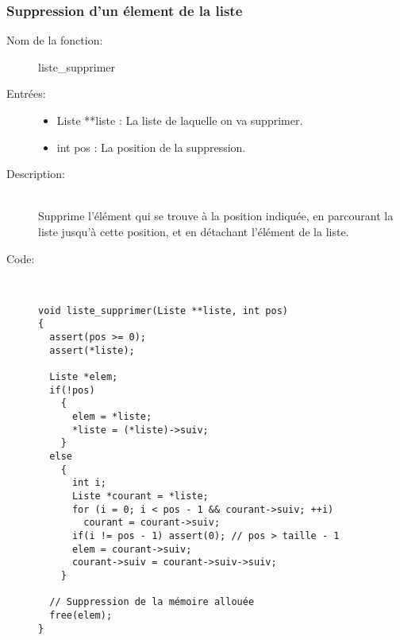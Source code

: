 \documentclass[a4paper]{article}
\begin{document}
\subsubsection{Suppression d'un élement de la liste}
\begin{description}
  \item[Nom de la fonction:] liste\_supprimer

  \item[Entrées:] \hfill
    \begin{itemize}
      \item Liste **liste : La liste de laquelle on va supprimer.
      \item int pos : La position de la suppression.
    \end{itemize}

  \item[Description:] \hfill \\ 
    Supprime l'élément qui se trouve à la position indiquée, en parcourant la 
    liste jusqu'à cette position, et en détachant l'élément de la liste.


  \item[Code:] \hfill \\
  \begin{lstlisting}
void liste_supprimer(Liste **liste, int pos)
{
  assert(pos >= 0);
  assert(*liste);

  Liste *elem;
  if(!pos)
    {
      elem = *liste;
      *liste = (*liste)->suiv;
    }
  else
    {
      int i;
      Liste *courant = *liste;
      for (i = 0; i < pos - 1 && courant->suiv; ++i)
        courant = courant->suiv;
      if(i != pos - 1) assert(0); // pos > taille - 1
      elem = courant->suiv;
      courant->suiv = courant->suiv->suiv;
    }

  // Suppression de la mémoire allouée
  free(elem);
}
  \end{lstlisting}
\end{description}
\end{document}
